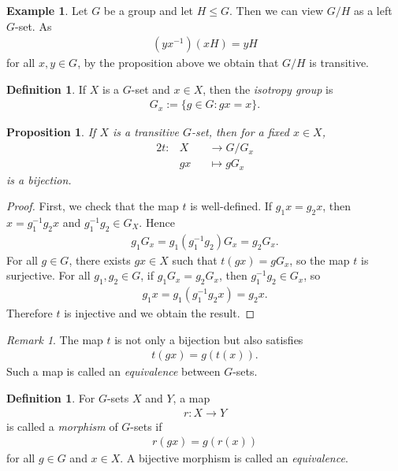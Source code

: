 \documentclass[12pt]{report}
\theoremstyle{plain}
\newtheorem{proposition}[theorem]{Proposition}
\theoremstyle{remark}
\newtheorem*{remark}{Remark}
\theoremstyle{definition}
\newtheorem{definition}[theorem]{Definition}
\newtheorem{example}[theorem]{Example}
\begin{document}
\begin{example}
    Let $G$ be a group and let $H\le G$. Then we can view $G/H$ as a left $G$-set. As
    \begin{align*}
        (yx^{-1})(xH)=yH
    \end{align*}
    for all $x,y\in G$, by the proposition above we obtain that $G/H$ is transitive.
\end{example}

\begin{definition}
    If $X$ is a $G$-set and $x\in X$, then the \emph{isotropy group} is
    \begin{align*}
        G_x := \{g\in G:gx=x\}.
    \end{align*}
\end{definition}

\begin{proposition}
    If $X$ is a transitive $G$-set, then for a fixed $x\in X$,
    \begin{alignat*}{2}
        t: & X &&\rightarrow G/G_x \\
        & gx &&\mapsto gG_x
    \end{alignat*}
    is a bijection.
\end{proposition}
\begin{proof}
    First, we check that the map $t$ is well-defined. If $g_1x=g_2x$, then $x = g_1^{-1}g_2x$ and $g_1^{-1}g_2\in G_X$. Hence
    \begin{align*}
        g_1G_x = g_1(g_1^{-1}g_2)G_x = g_2G_x.
    \end{align*}
    For all $g\in G$, there exists $gx\in X$ such that $t(gx)=gG_x$, so the map $t$ is surjective. For all $g_1,g_2\in G$, if $g_1G_x = g_2G_x$, then $g_1^{-1}g_2\in G_x$, so
    \begin{align*}
        g_1x = g_1 (g_1^{-1}g_2 x) = g_2 x.
    \end{align*}
    Therefore $t$ is injective and we obtain the result.
\end{proof}
\begin{remark}
    The map $t$ is not only a bijection but also satisfies
    \begin{align*}
        t(gx)=g(t(x)).
    \end{align*}
    Such a map is called an \emph{equivalence} between $G$-sets.
\end{remark}

\begin{definition}
    For $G$-sets $X$ and $Y$, a map
    \begin{align*}
        r:X\rightarrow Y
    \end{align*}
    is called a \emph{morphism} of $G$-sets if
    \begin{align*}
        r(gx) = g(r(x))
    \end{align*}
    for all $g\in G$ and $x\in X$. A bijective morphism is called an \emph{equivalence}.
\end{definition}
\end{document}
